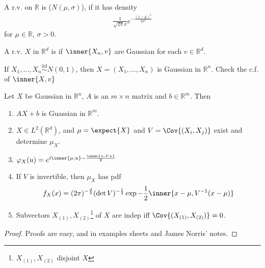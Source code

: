 \begin{definition}[Gaussian]
	A r.v. on $\mathbb{R}$ is  ($N(\mu, \sigma)$), if it has density
	\begin{align*}
		\frac{1}{\sqrt{2\pi} \sigma} e^{- \frac{(x - \mu)^2}{2\sigma^2}}
	\end{align*}
	for $\mu \in \mathbb{R}$, $\sigma > 0$.
\end{definition}

\begin{definition}[Gaussian]
	A r.v. $X$ in $\mathbb R^d$ is  if $\inner{X_n, v}$ are Gaussian for each $v \in \mathbb R^d$.
\end{definition}

\begin{example}
	If $X_1, \dots, X_n \overset{\text{iid}}{\sim} N(0, 1)$, then $X = (X_1, \dots, X_n)$ is Gaussian in $\mathbb{R}^n$.
	Check the c.f. of $\inner{X, v}$
\end{example}

\begin{proposition}
	Let $X$ be Gaussian in $\mathbb R^n$, $A$ is an $m \times n$ matrix and $b \in \mathbb R^m$.
	Then
	\begin{enumerate}
		\item $AX + b$ is Guassian in $\mathbb{R}^m$.
		\item $X \in L^2(\mathbb R^d)$, and $\mu = \expect{X}$ and $V = \Cov{(X_i, X_j)}$ exist and determine $\mu_X$.
		\item $\varphi_X(u) = e^{i\inner{\mu,u} - \frac{\inner{u,Vu}}{2}}$
		\item If $V$ is invertible, then $\mu_X$ has pdf
		\[ f_X(x) = (2\pi)^{-\frac{d}{2}} (\det V)^{-\frac{1}{2}} \exp{-\frac{1}{2} \inner{x-\mu, V^{-1}(x - \mu)}} \]
		\item Subvectors $X_{(1)}, X_{(2)}$\footnote{$X_{(1)}, X_{(2)}$ disjoint $X$} of $X$ are indep iff $\Cov{(X_{(1)}, X_{(2)})} = 0$.
	\end{enumerate}
\end{proposition}

\begin{proof}
	Proofs are easy, and in examples sheets and James Norris' notes.
\end{proof}


